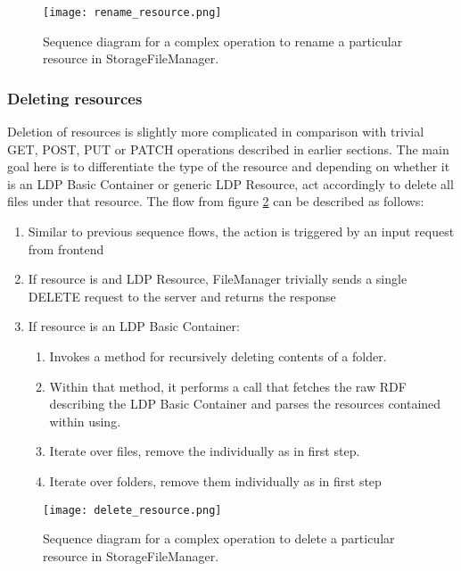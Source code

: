 \begin{figure}[h]
\centering
\texttt{[image: rename\_resource.png]}
\caption{Sequence diagram for a complex operation to rename a particular resource in StorageFileManager.}
\label{fig:lps_rename_resource}
\end{figure}

\subsubsection{Deleting resources}

Deletion of resources is slightly more complicated in comparison with trivial GET, POST, PUT or PATCH operations described in earlier sections. The main goal here is to differentiate the type of the resource and depending on whether it is an LDP Basic Container or generic LDP Resource, act accordingly to delete all files under that resource. 
The flow from figure \ref{fig:lps_delete_resource} can be described as follows:

\begin{enumerate}
    \item Similar to previous sequence flows, the action is triggered by an input request from \lpa{} frontend
    \item If resource is and LDP Resource, FileManager trivially sends 
   	a single DELETE request to the server and returns the response
    \item If resource is an LDP Basic Container:
    	\begin{enumerate}
    	\item Invokes a method for recursively deleting contents of a folder.
    	\item Within that method, it performs a call that fetches the raw RDF describing the LDP Basic Container and parses the resources contained within using. 
    	\item Iterate over files, remove the individually as in first step.
    	\item Iterate over folders, remove them individually as in first step 
    	\end{enumerate}
\end{enumerate}


\begin{figure}[h]
\centering
\texttt{[image: delete\_resource.png]}
\caption{Sequence diagram for a complex operation to delete a particular resource in StorageFileManager.}
\label{fig:lps_delete_resource}
\end{figure}


